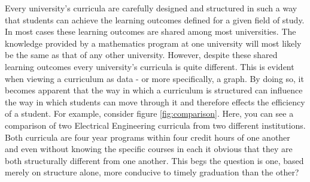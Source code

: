 \documentclass[botnum, fleqn]{unmeethesis}
\begin{document}
  Every university's curricula are carefully designed and structured in such a way that students can achieve the learning outcomes defined for a given field of study. In most cases these learning outcomes are shared among most universities. The knowledge provided by a mathematics program at one university will most likely be the same as that of any other university. However, despite these shared learning outcomes every university's curricula is quite different. This is evident when viewing a curriculum as data - or more specifically, a graph. By doing so, it becomes apparent that the way in which a curriculum is structured can influence the way in which students can move through it and therefore effects the efficiency of a student. For example, consider figure \ref{fig:comparison}. Here, you can see a comparison of two Electrical Engineering curricula from two different institutions. Both curricula are four year programs within four credit hours of one another and even without knowing the specific courses in each it obvious that they are both structurally different from one another. This begs the question is one, based merely on structure alone, more conducive to timely graduation than the other?
\end{document}
